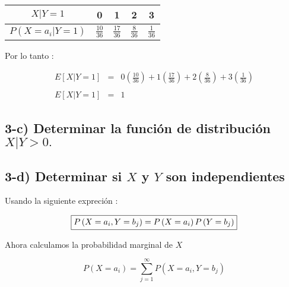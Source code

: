 \documentclass[12pt]{article}
\begin{document}
\begin{center}
    \renewcommand{\arraystretch}{1.5}
    \begin{tabular}{|c|c|c|c|c|}
        \hline
        $X|Y = 1$                      & 0               & 1               & 2              & 3
        \\
        \hline
        $P\left(X = a_i| Y = 1\right)$ & $\frac{10}{36}$ & $\frac{17}{36}$ & $\frac{8}{36}$ & $\frac{1}{36}$
        \\
        \hline
    \end{tabular}
\end{center}


Por lo tanto :

\begin{equation*}
    \begin{array}{rcl}
        E[X|Y = 1] & = & \displaystyle 0  \left(\frac{10}{36}\right) + 1 \left(\frac{17}{36} \right) + 2 \left(\frac{8}{36}\right)  + 3 \left( \frac{1}{36} \right)
        \\
        \\
        E[X|Y = 1] & = & 1
    \end{array}
\end{equation*}

\subsection*{3-c) Determinar la funci\'on de distribuci\'on $ X | Y > 0.$}


\subsection*{3-d) Determinar si $X$ y $Y$ son independientes}

Usando la siguiente expreci\'on :


\begin{equation}
    \fbox{$
    \displaystyle P\left(X = a_i,Y = b_j\right)  =  P\left(X = a_i\right) P\left(Y = b_j\right)
    $}
\end{equation}

\begin{flushleft}
    Ahora calculamos la probabilidad marginal de $X$
\end{flushleft}

\begin{equation*}
    \displaystyle P\left(X = a_i\right)  =  \displaystyle \sum_{j=1}^{\infty} P \left(X = a_i,Y = b_j\right)
\end{equation*}
\end{document}
